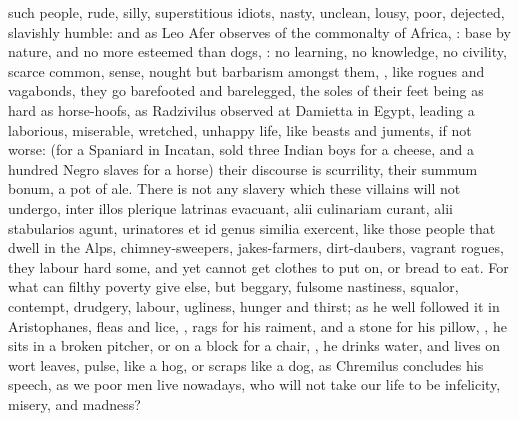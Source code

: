 {{such people, rude, silly, superstitious idiots, nasty, unclean, lousy,
poor, dejected, slavishly humble: and as Leo Afer observes of the
commonalty of Africa, : base by nature, and no more
esteemed than dogs, : no
learning, no knowledge, no civility, scarce common, sense, nought but
barbarism amongst them, , like rogues and vagabonds, they go barefooted and
barelegged, the soles of their feet being as hard as horse-hoofs, as
Radzivilus observed at Damietta in Egypt, leading a laborious,
miserable, wretched, unhappy life, like beasts and juments, if
not worse: (for a Spaniard in Incatan, sold three Indian boys for
a cheese, and a hundred Negro slaves for a horse) their discourse is
scurrility, their summum bonum, a pot of ale. There is not any slavery
which these villains will not undergo, inter illos plerique latrinas
evacuant, alii culinariam curant, alii stabularios agunt, urinatores et
id genus similia exercent, \etc{} like those people that dwell in the
Alps, chimney-sweepers, jakes-farmers, dirt-daubers, vagrant
rogues, they labour hard some, and yet cannot get clothes to put on, or
bread to eat. For what can filthy poverty give else, but beggary,
fulsome nastiness, squalor, contempt, drudgery, labour, ugliness,
hunger and thirst;  as he well
followed it in Aristophanes, fleas and lice, , rags for his raiment,
and a stone for his pillow, , he sits
in a broken pitcher, or on a block for a chair, , he drinks water, and lives on wort leaves, pulse, like
a hog, or scraps like a dog,  as Chremilus concludes his
speech, as we poor men live nowadays, who will not take our life to be
 infelicity, misery, and madness?

}}

